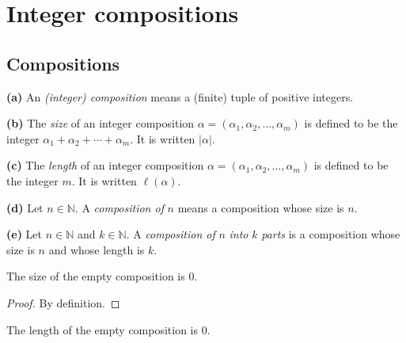\section{Integer compositions}

\subsection{Compositions}

\begin{definition}
\label{def.fps.comps}
\leantarget
\leanok
\textbf{(a)} An \emph{(integer) composition} means a
(finite) tuple of positive integers. \medskip

\textbf{(b)} The \emph{size} of an integer composition $\alpha=\left(
\alpha_{1},\alpha_{2},\ldots,\alpha_{m}\right)  $ is defined to be the integer
$\alpha_{1}+\alpha_{2}+\cdots+\alpha_{m}$. It is written $\left\vert
\alpha\right\vert $. \medskip

\textbf{(c)} The \emph{length} of an integer composition $\alpha=\left(
\alpha_{1},\alpha_{2},\ldots,\alpha_{m}\right)  $ is defined to be the integer
$m$. It is written $\ell\left(  \alpha\right)  $. \medskip

\textbf{(d)} Let $n\in\mathbb{N}$. A \emph{composition of }$n$ means a
composition whose size is $n$. \medskip

\textbf{(e)} Let $n\in\mathbb{N}$ and $k\in\mathbb{N}$. A \emph{composition of
}$n$\emph{ into }$k$\emph{ parts} is a composition whose size is $n$ and whose
length is $k$.
\end{definition}

\begin{lemma}
\label{lem.fps.comps.size-nil}
\leanhelper
\leanok
The size of the empty composition is $0$.
\end{lemma}

\begin{proof}
\leanok
By definition.
\end{proof}

\begin{lemma}
\label{lem.fps.comps.len-nil}
\leanhelper
\leanok
The length of the empty composition is $0$.
\end{lemma}


